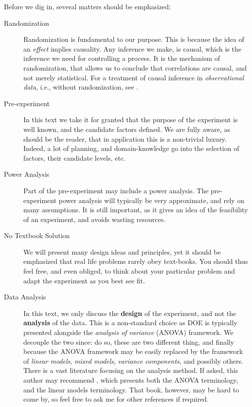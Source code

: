 \documentclass[12pt,a4paper]{report}
\theoremstyle{plain}
\theoremstyle{definition}
\begin{document}
Before we dig in, several matters should be emphasized:
\begin{description}
\item [Randomization] Randomization is fundamental to our purpose. This is because the idea of an \emph{effect} implies causality. Any inference we make, is causal, which is the inference we need for controlling a process.
It is the mechanism of randomization, that allows us to conclude that correlations are causal, and not merely statistical.
For a treatment of causal inference in \emph{observational data}, i.e., without randomization, see \cite{rosenbaum_observational_2002}.

\item [Pre-experiment] In this text we take it for granted that the purpose of the experiment is well known, and the candidate factors defined. We are fully aware, as should be the reader, that in application this is a non-trivial luxury. Indeed, a lot of planning, and domain-knowledge go into the selection of factors, their candidate levels, etc.

\item [Power Analysis] Part of the pre-experiment may include a power analysis. The pre-experiment power analysis will typically be very approximate, and rely on many assumptions. It is still important, as it gives an idea of the feasibility of an experiment, and avoids wasting resources.

\item [No Textbook Solution] We will present many design ideas and principles, yet it should be emphasized that real life problems rarely obey text-books. You should thus feel free, and even obliged, to think about your particular problem and adapt the experiment as you best see fit. 

\item[Data Analysis]
In this text, we only discuss the \textbf{design} of the experiment, and not the \textbf{analysis} of the data.
This is a non-standard choice as DOE is typically presented alongside the \emph{analysis of variance} (ANOVA) framework.
We decouple the two since: 
\cite{cox_theory_2000} do so, 
these are two different thing, and finally because the ANOVA framework may be easily replaced by the framework of \emph{linear models}, \emph{mixed models}, \emph{variance components}, and possibly others. 
There is a vast literature focusing on the analysis method. 
If asked, this author may recommend \cite{hocking_analysis_1985}, which presents both the ANOVA terminology, and the linear models terminology.
That book, however, may be hard to come by, so feel free to ask me for other references if required.

\end{description}
\end{document}
